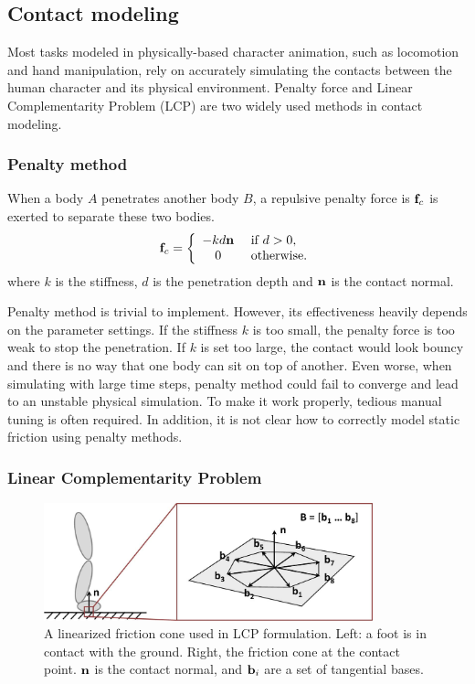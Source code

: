 \subsection{Contact modeling}

Most tasks modeled in physically-based character animation, such as locomotion and hand manipulation, rely on accurately simulating the contacts between the human character and its physical environment. Penalty force and Linear Complementarity Problem (LCP) are two widely used methods in contact modeling.

\subsubsection{Penalty method}
When a body $A$ penetrates another body $B$, a repulsive penalty force is $\mathbf{f}_c$ is exerted to separate these two bodies.
\begin{equation}
\mathbf{f}_c=
\left\{
\begin{array}{cl}
-kd\mathbf{n} & \textrm{        if } d > 0,\\
0 & \textrm{        otherwise.}
\end{array}
\right.
\end{equation}
where $k$ is the stiffness, $d$ is the penetration depth and $\mathbf{n}$ is the contact normal. 

Penalty method is trivial to implement. However, its effectiveness heavily depends on the parameter settings. If the stiffness $k$ is too small, the penalty force is too weak to stop the penetration. If $k$ is set too large, the contact would look bouncy and there is no way that one body can sit on top of another. Even worse, when simulating with large time steps, penalty method could fail to converge and lead to an unstable physical simulation. To make it work properly, tedious manual tuning is often required. In addition, it is not clear how to correctly model static friction using penalty methods.

\subsubsection{Linear Complementarity Problem}


\begin{figure}[h]
  \centering
  \includegraphics[width=0.85\textwidth]{figures/contact.jpg}
  \caption{A linearized friction cone used in LCP formulation. Left: a foot is in contact with the ground. Right, the friction cone at the contact point. $\mathbf{n}$ is the contact normal, and $\mathbf{b}_i$ are a set of tangential bases.}
  \label{fig:contactCone}
\end{figure}

